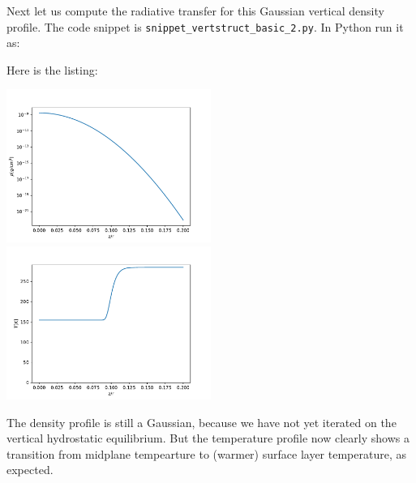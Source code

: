 \documentclass{book}
\newcommand{\code}[1]{{\small\tt #1}}
\begin{document}
Next let us compute the radiative transfer for this Gaussian vertical density profile.
The code snippet is
\code{snippet\_vertstruct\_basic\_2.py}. In Python run it as:
\begin{codebox}
\end{codebox}
Here is the listing:

\centerline{\includegraphics[width=0.5\textwidth]{../snippets/fig_snippet_vertstruct_basic_2_1.pdf}
  \includegraphics[width=0.5\textwidth]{../snippets/fig_snippet_vertstruct_basic_2_2.pdf}}
The density profile is still a Gaussian, because we have not yet iterated on the vertical
hydrostatic equilibrium. But the temperature profile now clearly shows a transition from
midplane tempearture to (warmer) surface layer temperature, as expected.
\end{document}
